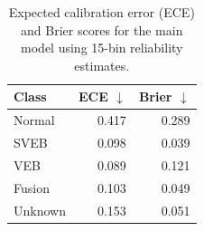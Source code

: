 \begin{table}[t]\centering
\caption{Expected calibration error (ECE) and Brier scores for the main model using 15-bin reliability estimates.}
\label{tab:calibration}
\begin{tabular}{lrr}
\toprule
Class & ECE $\downarrow$ & Brier $\downarrow$ \\
\midrule
Normal & 0.417 & 0.289 \\
SVEB & 0.098 & 0.039 \\
VEB & 0.089 & 0.121 \\
Fusion & 0.103 & 0.049 \\
Unknown & 0.153 & 0.051 \\
\bottomrule
\end{tabular}
\end{table}
